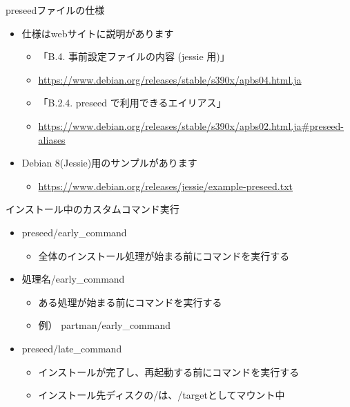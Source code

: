 \begin{frame}[containsverbatim]{preseedファイルの仕様}
  \begin{itemize}
  \item 仕様はwebサイトに説明があります
    \begin{itemize}
    \item 「B.4. 事前設定ファイルの内容 (jessie 用)」
    \item \url{https://www.debian.org/releases/stable/s390x/apbs04.html.ja}
    \item 「B.2.4. preseed で利用できるエイリアス」
    \item \url{https://www.debian.org/releases/stable/s390x/apbs02.html.ja#preseed-aliases}
    \end{itemize}
  \item Debian 8(Jessie)用のサンプルがあります
    \begin{itemize}
    \item \url{https://www.debian.org/releases/jessie/example-preseed.txt}
    \end{itemize}
  \end{itemize}
\end{frame}


\begin{frame}[containsverbatim]{インストール中のカスタムコマンド実行}
  \begin{itemize}
  \item preseed/early\_command
    \begin{itemize}
    \item 全体のインストール処理が始まる前にコマンドを実行する
    \end{itemize}
  \item 処理名/early\_command　
    \begin{itemize}
      \item ある処理が始まる前にコマンドを実行する
      \item 例） partman/early\_command 
    \end{itemize}
  \item preseed/late\_command
    \begin{itemize}
    \item インストールが完了し、再起動する前にコマンドを実行する
    \item インストール先ディスクの/は、/targetとしてマウント中
    \end{itemize}
  \end{itemize}
\end{frame}


